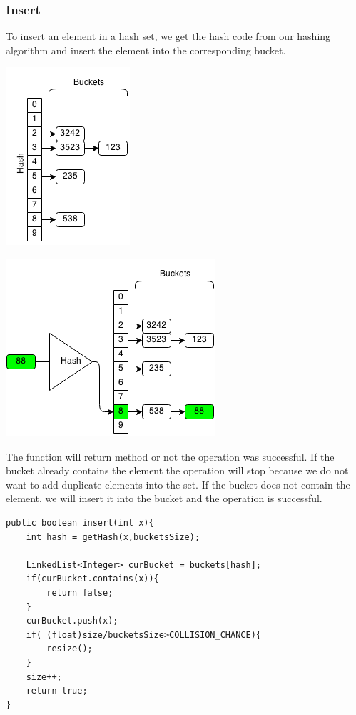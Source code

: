 \documentclass[11pt,oneside]{book}
\makeatletter
\def\maxwidth#1{\ifdim\Gin@nat@width>#1 #1\else\Gin@nat@width\fi}
\makeatother
\begin{document}
\subsubsection{Insert}

To insert an element in a hash set, we get the hash code from our hashing algorithm and insert the element into the corresponding bucket.

\vspace{5px}\includegraphics[width=\maxwidth{\textwidth}]{hashset.png}

\vspace{5px}\includegraphics[width=\maxwidth{\textwidth}]{hashsetinsert.png}

The function will return method or not the operation was successful. If the bucket already contains the element the operation will stop because we do not want to add duplicate elements into the set. If the bucket does not contain the element, we will insert it into the bucket and the operation is successful.

\begin{lstlisting}
public boolean insert(int x){
    int hash = getHash(x,bucketsSize);
        
    LinkedList<Integer> curBucket = buckets[hash];
    if(curBucket.contains(x)){
        return false;
    }
    curBucket.push(x);
    if( (float)size/bucketsSize>COLLISION_CHANCE){
        resize();
    }
    size++;
    return true;
}
\end{lstlisting}
\end{document}
